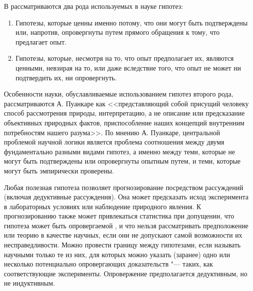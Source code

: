 В \cite{Poincare2015} рассматриваются два рода используемых в науке гипотез: 

\begin{enumerate}
    \item Гипотезы, которые ценны именно потому, что они могут быть подтверждены или, напротив, опровергнуты путем 
        прямого обращения к тому, что предлагает опыт.
    \item Гипотезы, которые, несмотря на то, что опыт предполагает их, являются ценными, невзирая на то, или даже 
        вследствие того, что опыт не может ни подтвердить их, ни опровергнуть.
\end{enumerate}

Особенности науки, обуславливаемые использованием гипотез второго рода, рассматриваются А. Пуанкаре как <<представляющий 
собой присущий человеку способ рассмотрения природы, интерпретацию, а не описание или предсказание объективных 
природных фактов, приспособление наших концепций внутренним потребностям нашего разума>>. По мнению А. Пуанкаре, 
центральной проблемой научной логики является проблема соотношения между двумя фундаментально разными видами гипотез, 
а именно между теми, которые не могут быть подтверждены или опровергнуты опытным путем, и теми, которые могут 
быть эмпирически проверены.

Любая полезная гипотеза позволяет прогнозирование посредством рассуждений (включая дедуктивные рассуждения). 
Она может предсказать исход эксперимента в лабораторных условиях или наблюдение природного явления. К прогнозированию 
также может привлекаться статистика при допущении, что гипотеза может быть опровергаемой \cite{Popper2005}, и что 
нельзя рассматривать предположение или теорию в качестве научных, если они не допускают самой возможности их 
несправедливости. Можно провести границу между гипотезами, если называть научными только те из них, для которых 
можно указать (заранее) одно или несколько потенциально опровергающих доказательств "--- таких, как соответствующие 
эксперименты. Опровержение предполагается дедуктивным, но не индуктивным.

